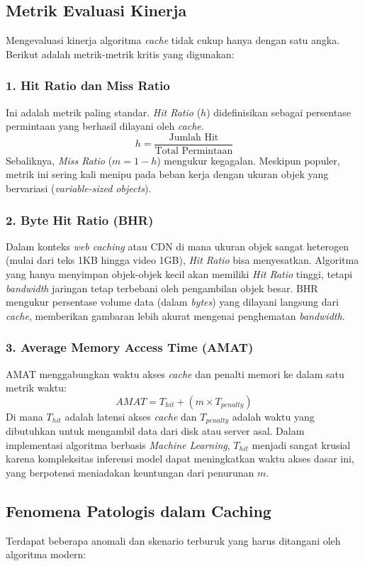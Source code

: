 \subsection{Metrik Evaluasi Kinerja}
Mengevaluasi kinerja algoritma \textit{cache} tidak cukup hanya
dengan satu angka. Berikut adalah metrik-metrik kritis yang digunakan:

\subsubsection{1. Hit Ratio dan Miss Ratio}
Ini adalah metrik paling standar. \textit{Hit Ratio} ($h$)
didefinisikan sebagai persentase permintaan yang berhasil dilayani
oleh \textit{cache}.
\[ h = \frac{\text{Jumlah Hit}}{\text{Total Permintaan}} \]
Sebaliknya, \textit{Miss Ratio} ($m = 1 - h$) mengukur kegagalan.
Meskipun populer, metrik ini sering kali menipu pada beban kerja
dengan ukuran objek yang bervariasi (\textit{variable-sized objects}).

\subsubsection{2. Byte Hit Ratio (BHR)}
Dalam konteks \textit{web caching} atau CDN di mana ukuran objek
sangat heterogen (mulai dari teks 1KB hingga video 1GB),
\textit{Hit Ratio} bisa menyesatkan.
Algoritma yang hanya menyimpan objek-objek kecil akan memiliki
\textit{Hit Ratio} tinggi, tetapi \textit{bandwidth} jaringan tetap
terbebani oleh pengambilan objek besar.
BHR mengukur persentase volume data (dalam \textit{bytes}) yang
dilayani langsung dari \textit{cache}, memberikan gambaran lebih
akurat mengenai penghematan \textit{bandwidth}.

\subsubsection{3. Average Memory Access Time (AMAT)}
AMAT menggabungkan waktu akses \textit{cache} dan penalti memori
ke dalam satu metrik waktu:
\[ AMAT = T_{hit} + (m \times T_{penalty}) \]
Di mana $T_{hit}$ adalah latensi akses \textit{cache} dan
$T_{penalty}$ adalah waktu yang dibutuhkan untuk mengambil data
dari disk atau server asal.
Dalam implementasi algoritma berbasis \textit{Machine Learning},
$T_{hit}$ menjadi sangat krusial karena kompleksitas inferensi model
dapat meningkatkan waktu akses dasar ini, yang berpotensi
meniadakan keuntungan dari penurunan $m$.

\subsection{Fenomena Patologis dalam Caching}
Terdapat beberapa anomali dan skenario terburuk yang harus ditangani
oleh algoritma modern:

